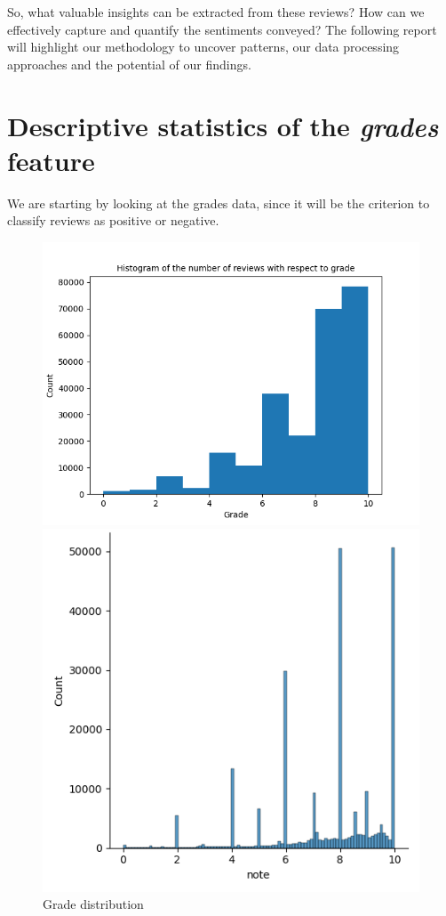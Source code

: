 \documentclass{article}
\begin{document}
So, what valuable insights can be extracted from these reviews? How can we effectively capture and quantify the sentiments conveyed?
The following report will highlight our methodology to uncover patterns, our data processing approaches and the potential of our findings.  
\newpage
\section{Descriptive statistics of the \textit{grades} feature}

We are starting by looking at the grades data, since it will be the criterion to classify reviews as positive or negative.
\begin{figure}[H]
  \centering
  \begin{minipage}[t]{0.49\linewidth}
    \centering
    \includegraphics[width=\linewidth]{hist_plot_count.png}
  \end{minipage}\hfill
  \begin{minipage}[t]{0.49\linewidth}
    \centering
    \includegraphics[width=\linewidth]{dist_plot_count.png}
  \end{minipage}
  \caption{Grade distribution}
\end{figure}
\end{document}
